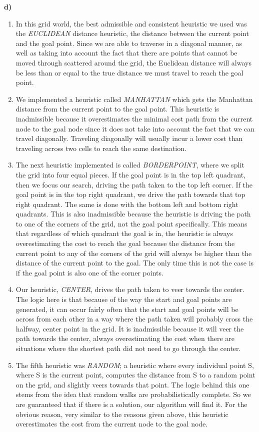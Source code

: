 \documentclass[11pt]{article}
\begin{document}
\textbf{d)} \begin{enumerate}
\item In this grid world, the best admissible and consistent heuristic we used was the \textit{EUCLIDEAN} distance heuristic, the distance between the current point and the goal point. Since we are able to traverse in a diagonal manner, as well as taking into account the fact that there are points that cannot be moved through scattered around the grid, the Euclidean distance will always be less than or equal to the true distance we must travel to reach the goal point.
\item We implemented a heuristic called \textit{MANHATTAN} which gets the Manhattan distance from the current point to the goal point. This heuristic is inadmissible because it overestimates the minimal cost path from the current node to the goal node since it does not take into account the fact that we can travel diagonally. Traveling diagonally will usually incur a lower cost than traveling across two cells to reach the same destination.
\item The next heuristic implemented is called \textit{BORDERPOINT}, where we split the grid into four equal pieces. If the goal point is in the top left quadrant, then we focus our search, driving the path taken to the top left corner. If the goal point is in the top right quadrant, we drive the path towards that top right quadrant. The same is done with the bottom left and bottom right quadrants. This is also inadmissible because the heuristic is driving the path to one of the corners of the grid, not the goal point specifically. This means that regardless of which quadrant the goal is in, the heuristic is always overestimating the cost to reach the goal because the distance from the current point to any of the corners of the grid will always be higher than the distance of the current point to the goal. The only time this is not the case is if the goal point is also one of the corner points.
\item Our heuristic, \textit{CENTER}, drives the path taken to veer towards the center. The logic here is that because of the way the start and goal points are generated, it can occur fairly often that the start and goal points will be across from each other in a way where the path taken will probably cross the halfway, center point in the grid. It is inadmissible because it will veer the path towards the center, always overestimating the cost when there are situations where the shortest path did not need to go through the center.
\item The fifth heuristic was \textit{RANDOM}; a heuristic where every individual point S, where S is the current point, computes the distance from S to a random point on the grid, and slightly veers towards that point. The logic behind this one stems from the idea that random walks are probabilistically complete. So we are guaranteed that if there is a solution, our algorithm will find it. For the obvious reason, very similar to the reasons given above, this heuristic overestimates the cost from the current node to the goal node.

\end{enumerate}
\end{document}
